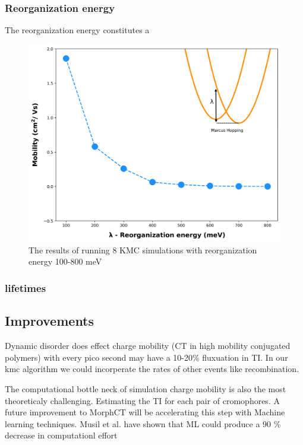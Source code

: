 \subsubsection{Reorganization energy}
The reorganization energy constitutes a 
\begin{figure}
  \center
  \includegraphics[width=\linewidth, height=\textheight,keepaspectratio]{figures/reorg.png} 
    \caption{The results of running 8 KMC simulations with reorganization energy 100-800 meV}
  \label{fig:reorg}
\end{figure}

\subsubsection{lifetimes}

\subsection{Improvements}
Dynamic disorder does effect charge mobility (CT in high mobility conjugated polymers) with every pico second
may have a 10-20\% fluxuation in TI. 
In our kmc algorithm we could incorperate the rates of other events like recombination.

The computational bottle neck of simulation charge mobility is also the most theoreticaly challenging.
Estimating the TI for each pair of cromophores. A future improvement to MorphCT will be accelerating this step
with Machine learning techniques. Musil et al. have shown that ML could produce a 90 \% decrease in
computationl effort \cite{Musil2018}

